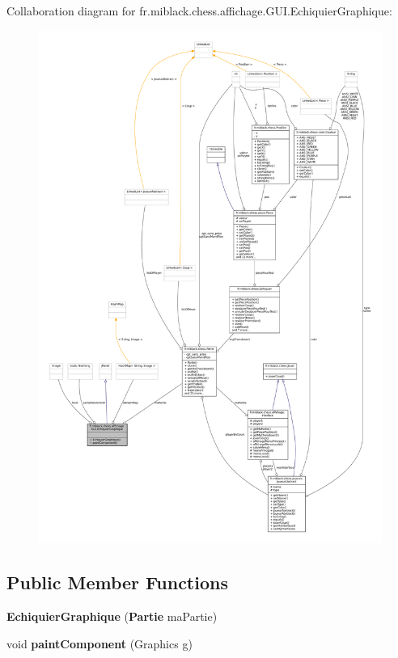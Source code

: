 Collaboration diagram for fr.\-miblack.\-chess.\-affichage.\-G\-U\-I.\-Echiquier\-Graphique\-:
\nopagebreak
\begin{figure}[H]
\begin{center}
\leavevmode
\includegraphics[width=350pt]{classfr_1_1miblack_1_1chess_1_1affichage_1_1GUI_1_1EchiquierGraphique__coll__graph}
\end{center}
\end{figure}
\subsection*{Public Member Functions}
\begin{DoxyCompactItemize}
\item 
{\bf Echiquier\-Graphique} ({\bf Partie} ma\-Partie)
\item 
void {\bf paint\-Component} (Graphics g)
\end{DoxyCompactItemize}
